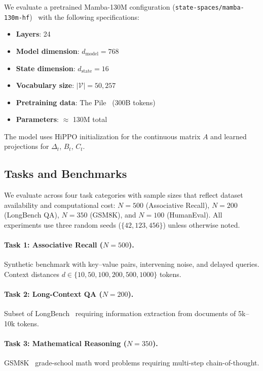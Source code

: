 \documentclass[10pt,twocolumn]{article}
\begin{document}
We evaluate a pretrained Mamba-130M configuration (\texttt{state-spaces/mamba-130m-hf})~\cite{gu2023mamba} with the following specifications:
\begin{itemize}
\item \textbf{Layers}: 24
\item \textbf{Model dimension}: $d_{\text{model}} = 768$
\item \textbf{State dimension}: $d_{\text{state}} = 16$
\item \textbf{Vocabulary size}: $|\mathcal{V}| = 50{,}257$
\item \textbf{Pretraining data}: The Pile~\cite{gao2020pile} (300B tokens)
\item \textbf{Parameters}: $\approx$ 130M total
\end{itemize}

The model uses HiPPO initialization for the continuous matrix $A$ and learned projections for $\Delta_t$, $B_t$, $C_t$.

\subsection{Tasks and Benchmarks}

We evaluate across four task categories with sample sizes that reflect dataset availability and computational cost: $N{=}500$ (Associative Recall), $N{=}200$ (LongBench QA), $N{=}350$ (GSM8K), and $N{=}100$ (HumanEval). All experiments use three random seeds ($\{42, 123, 456\}$) unless otherwise noted.

\paragraph{Task 1: Associative Recall ($N{=}500$).}
Synthetic benchmark with key--value pairs, intervening noise, and delayed queries. Context distances $d \in \{10, 50, 100, 200, 500, 1000\}$ tokens.

\paragraph{Task 2: Long-Context QA ($N{=}200$).}
Subset of LongBench~\cite{bai2023longbench} requiring information extraction from documents of 5k--10k tokens.

\paragraph{Task 3: Mathematical Reasoning ($N{=}350$).}
GSM8K~\cite{cobbe2021training} grade-school math word problems requiring multi-step chain-of-thought. %
\end{document}

